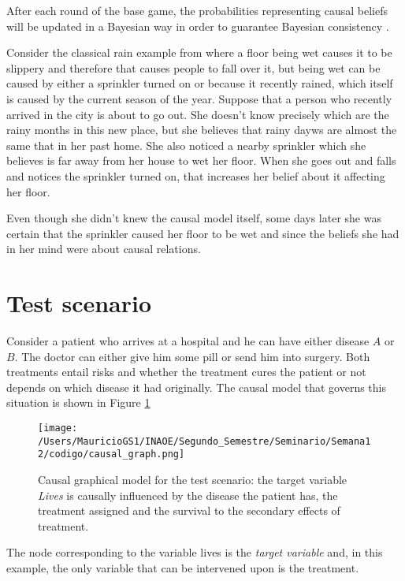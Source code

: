 \documentclass{article}
\begin{document}
After each round of the base game, the probabilities representing causal beliefs will be updated in a Bayesian way in order to guarantee Bayesian consistency \cite{shoham2008multiagent}.

Consider the classical rain example from \cite{pearl2009causality} where a floor being wet causes it to be slippery and therefore that causes people to fall over it, but being wet can be caused by either a sprinkler turned on or because it recently rained, which itself is caused by the current season of the year. Suppose that a person who recently arrived in the city is about to go out. She doesn't know precisely which are the rainy months in this new place, but she believes that rainy dayws are almost the same that in her past home. She also noticed a nearby sprinkler which she believes is far away from her house to wet her floor. When she goes out and falls and notices the sprinkler turned on, that increases her belief about it affecting her floor. 

Even though she didn't knew the causal model itself, some days later she was certain that the sprinkler caused her floor to be wet and since the beliefs she had in her mind were about causal relations.
\section{Test scenario}
Consider a patient who arrives at a hospital and he can have either disease $A$ or $B$. The doctor can either give him some pill or send him into surgery.  Both treatments entail risks and whether the treatment cures the patient or not depends on which disease it had originally. The causal model that governs this situation is shown in Figure \ref{causal_model}

\begin{figure}[ht]
\vskip 0.2in
\begin{center}
\centerline{\texttt{[image: /Users/MauricioGS1/INAOE/Segundo\_Semestre/Seminario/Semana12/codigo/causal\_graph.png]}}
\caption{Causal graphical model for the test scenario: the target variable \textit{Lives} is causally influenced by the disease the patient has, the treatment assigned and the survival to the secondary effects of treatment.}
\label{causal_model}
\end{center}
\vskip -0.2in
\end{figure}

The node corresponding to the variable lives is the \textit{target variable} and, in this example, the only variable that can be intervened upon is the treatment.
\end{document}
